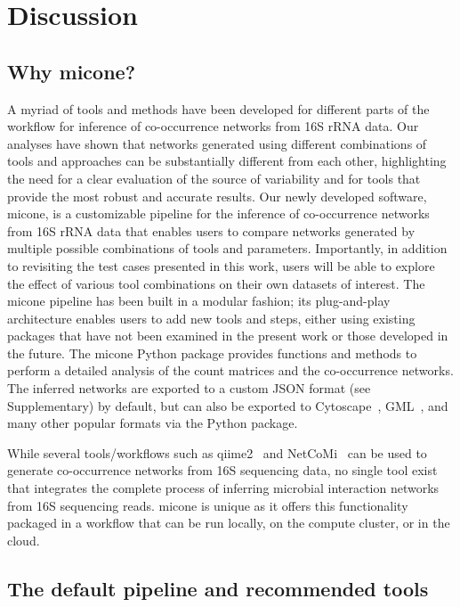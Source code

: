 \documentclass[letterpaper,12pt]{article}
\begin{document}
\section*{Discussion}

  \subsection*{Why \ac{micone}?}

  A myriad of tools and methods have been developed for different parts of the workflow for inference of co-occurrence networks from 16S rRNA data.
  Our analyses have shown that networks generated using different combinations of tools and approaches can be substantially different from each other, highlighting the need for a clear evaluation of the source of variability and for tools that provide the most robust and accurate results.
  Our newly developed software, \ac{micone}, is a customizable pipeline for the inference of co-occurrence networks from 16S rRNA data that enables users to compare networks generated by multiple possible combinations of tools and parameters.
  Importantly, in addition to revisiting the test cases presented in this work, users will be able to explore the effect of various tool combinations on their own datasets of interest.
  The \ac{micone} pipeline has been built in a modular fashion; its plug-and-play architecture enables users to add new tools and steps, either using existing packages that have not been examined in the present work or those developed in the future.
  The \ac{micone} Python package provides functions and methods to perform a detailed analysis of the count matrices and the co-occurrence networks.
  The inferred networks are exported to a custom JSON format (see Supplementary) by default, but can also be exported to Cytoscape~\cite{shannonCytoscapeSoftwareEnvironment2003}, GML~\cite{himsoltGMLPortableGraph2010}, and many other popular formats via the Python package.

  While several tools/workflows such as \ac{qiime2}~\cite{bolyenReproducibleInteractiveScalable2019} and NetCoMi~\cite{peschelNetCoMiNetworkConstruction2020} can be used to generate co-occurrence networks from 16S sequencing data, no single tool exist that integrates the complete process of inferring microbial interaction networks from 16S sequencing reads.
  \ac{micone} is unique as it offers this functionality packaged in a workflow that can be run locally, on the compute cluster, or in the cloud.

  \subsection*{The default pipeline and recommended tools}
\end{document}
